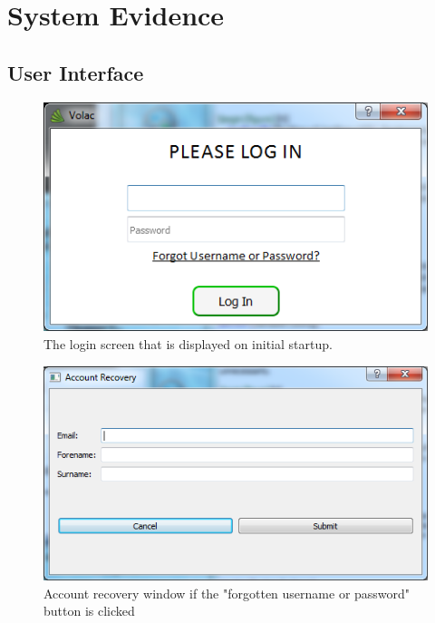 \section{System Evidence}

\subsection{User Interface}


\begin{figure}[H]
    \includegraphics[width=\textwidth]{./Maintenance/Images/LoginWindow.png}
    \caption{The login screen that is displayed on initial startup.} \label{fig:LoginWindow}
\end{figure}

\begin{figure}[H]
    \includegraphics[width=\textwidth]{./Maintenance/Images/AccountRecovery.png}
    \caption{Account recovery window if the "forgotten username or password" button is clicked} \label{fig:AccountRecovery}
\end{figure}

